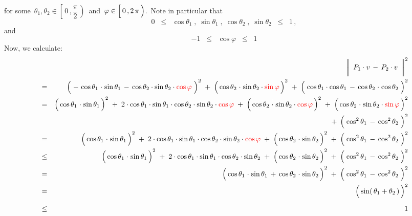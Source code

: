 for some \,$\theta_{1}, \theta_{2} \in \left[\,0\,,\dfrac{\pi}{2}\,\right)$\, and
\,$\varphi \in \left[\,0\,,\overset{{\color{white}.}}{2\,\pi}\,\right)$.\,
Note in particular that
\begin{equation*}
0
\;\; \leq \;\;
	\cos\theta_{1} \; , \; \sin\theta_{1} \; , \; \cos\theta_{2} \; , \; \sin\theta_{2}
\;\; \leq \;\;
	1\,,
\end{equation*}
and
\begin{equation*}
-1
\;\; \leq \;\;
	\cos\varphi
\;\; \leq \;\;
	1
\end{equation*}
Now, we calculate:
\begin{eqnarray*}
&&
	\left\Vert\;\, P_{1}\cdot v \, \overset{{\color{white}1}}{-} \, P_{2}\cdot v \,\;\right\Vert^{2}
\\
& = &
	\left(\;
		-\,\cos\theta_{1}\overset{{\color{white}1}}{\cdot}\sin\theta_{1} \, - \, \cos\theta_{2}\cdot\sin\theta_{2}\cdot{\color{red}\cos\varphi}
		\;\right)^{2}
	\; + \;
	\left(\,\cos\theta_{2}\overset{{\color{white}1}}{\cdot}\sin\theta_{2}\cdot{\color{red}\sin\varphi}\,\right)^{2}
	\; + \;
	\left(\;
		\cos\theta_{1}\cdot\cos\theta_{1} \, - \, \cos\theta_{2}\overset{{\color{white}1}}{\cdot}\cos\theta_{2}
		\;\right)^{2}
\\
& = &
	\left(\,\cos\theta_{1}\overset{{\color{white}1}}{\cdot}\sin\theta_{1}\,\right)^{2}
	\; + \;
	2\cdot\cos\theta_{1}\cdot\sin\theta_{1}\cdot\cos\theta_{2}\cdot\sin\theta_{2}\cdot{\color{red}\cos\varphi}
	\; + \;
	\left(\,\cos\theta_{2}\overset{{\color{white}1}}{\cdot}\sin\theta_{2}\cdot{\color{red}\cos\varphi}\,\right)^{2}
	\; + \;
	\left(\,\cos\theta_{2}\overset{{\color{white}1}}{\cdot}\sin\theta_{2}\cdot{\color{red}\sin\varphi}\,\right)^{2}
\\
&&
	\; + \;
	\left(\; \cos^{2}\theta_{1} \, \overset{{\color{white}.}}{-} \, \cos^{2}\theta_{2} \;\right)^{2}
\\
& = &
	\left(\,\cos\theta_{1}\overset{{\color{white}1}}{\cdot}\sin\theta_{1}\,\right)^{2}
	\; + \;
	2\cdot\cos\theta_{1}\cdot\sin\theta_{1}\cdot\cos\theta_{2}\cdot\sin\theta_{2}\cdot{\color{red}\cos\varphi}
	\; + \;
	\left(\,\cos\theta_{2}\overset{{\color{white}1}}{\cdot}\sin\theta_{2}\,\right)^{2}
	\; + \;
	\left(\; \cos^{2}\theta_{1} \, \overset{{\color{white}.}}{-} \, \cos^{2}\theta_{2} \;\right)^{2}
\\
& \leq &
	\left(\,\cos\theta_{1}\overset{{\color{white}1}}{\cdot}\sin\theta_{1}\,\right)^{2}
	\; + \;
	2\cdot\cos\theta_{1}\cdot\sin\theta_{1}\cdot\cos\theta_{2}\cdot\sin\theta_{2}
	\; + \;
	\left(\,\cos\theta_{2}\overset{{\color{white}1}}{\cdot}\sin\theta_{2}\,\right)^{2}
	\; + \;
	\left(\; \cos^{2}\theta_{1} \, \overset{{\color{white}.}}{-} \, \cos^{2}\theta_{2} \;\right)^{2}
\\
& = &
	\left(\,
		\cos\theta_{1}\overset{{\color{white}1}}{\cdot}\sin\theta_{1}
		\, + \,
		\cos\theta_{2}\overset{{\color{white}1}}{\cdot}\sin\theta_{2}
		\,\right)^{2}
	\; + \;
	\left(\; \cos^{2}\theta_{1} \, \overset{{\color{white}.}}{-} \, \cos^{2}\theta_{2} \;\right)^{2}
\\
& = &
	\left(\,\sin(\,\theta_{1} \overset{{\color{white}.}}{+} \theta_{2}\,) \,\right)^{2}
\\
& \overset{{\color{white}1}}{\leq} &
	1
\end{eqnarray*}
